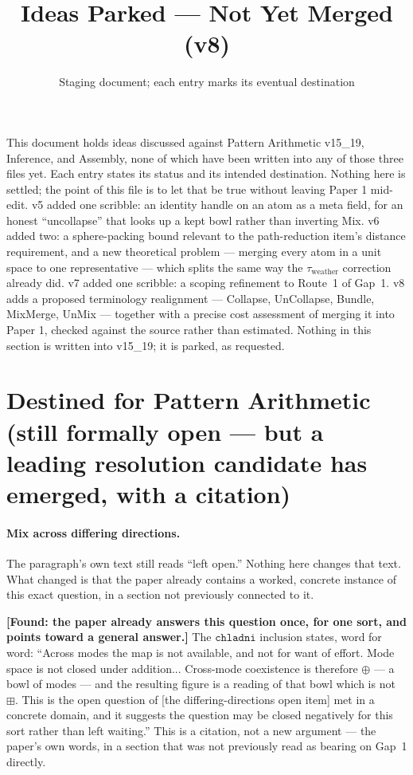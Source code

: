 \documentclass[11pt]{article}
\title{Ideas Parked --- Not Yet Merged (v8)}
\author{Staging document; each entry marks its eventual destination}
\date{}
\begin{document}
\maketitle

\noindent This document holds ideas discussed against Pattern Arithmetic
v15\_19, Inference, and Assembly, none of which have been written into
any of those three files yet. Each entry states its status and its
intended destination. Nothing here is settled; the point of this file
is to let that be true without leaving Paper 1 mid-edit.
v5 added one scribble: an identity handle on an atom as a meta field,
for an honest ``uncollapse'' that looks up a kept bowl rather than
inverting Mix. v6 added two: a sphere-packing bound relevant to the
path-reduction item's distance requirement, and a new theoretical
problem --- merging every atom in a unit space to one representative
--- which splits the same way the $\tau_{\text{weather}}$ correction
already did. v7 added one scribble: a scoping refinement to Route~1 of
Gap~1. v8 adds a proposed terminology realignment --- Collapse,
UnCollapse, Bundle, MixMerge, UnMix --- together with a precise cost
assessment of merging it into Paper 1, checked against the source
rather than estimated. Nothing in this section is written into
v15\_19; it is parked, as requested.

\section{Destined for Pattern Arithmetic (still formally open ---
but a leading resolution candidate has emerged, with a citation)}

\paragraph{Mix across differing directions.} The paragraph's own text
still reads ``left open.'' Nothing here changes that text. What
changed is that the paper already contains a worked, concrete instance
of this exact question, in a section not previously connected to it.

\textbf{[Found: the paper already answers this question once, for one
sort, and points toward a general answer.]} The $\mathtt{chladni}$
inclusion states, word for word: ``Across modes the map is not
available, and not for want of effort. Mode space is not closed under
addition... Cross-mode coexistence is therefore $\oplus$ --- a bowl of
modes --- and the resulting figure is a reading of that bowl which is
not $\boxplus$. This is the open question of
[the differing-directions open item] met in a concrete domain,
and it suggests the question may be closed negatively for this sort
rather than left waiting.'' This is a citation, not a new argument ---
the paper's own words, in a section that was not previously read as
bearing on Gap~1 directly.
\end{document}
